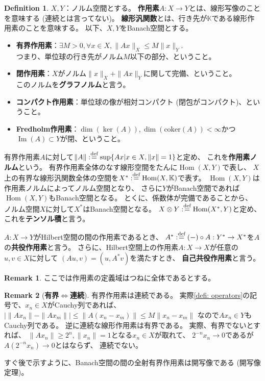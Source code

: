 \documentclass[uplatex]{jsarticle}
\theoremstyle{definition}
\newtheorem{defi}[defi]{Definition}
\newtheorem{rem}[rem]{Remark}
\DeclareMathOperator{\Hom}{Hom}
\DeclareMathOperator{\im}{\mathrm{Im}}
\newcommand{\coker}{\mathrm{coker}}
\newcommand{\dfn}{:\overset{\mbox{{\scriptsize def}}}{=}}
\newcommand{\K}{\mathbb{K}}
\begin{document}
\begin{defi}\label{defi: operators}
  \(X,Y\)：ノルム空間とする。
  \textbf{作用素}\(A:X\to Y\)とは、線形写像のことを意味する (連続とは言ってない)。
  \textbf{線形汎関数}とは、行き先が\(\K\)である線形作用素のことを意味する。
  以下、\(X,Y\)をBanach空間とする。
  \begin{itemize}
    \item \textbf{有界作用素}：\(\exists M>0, \forall x\in X, \|Ax\|_X \leq M\|x\|_Y\). \\
    つまり、単位球の行き先がノルム\(M\)以下の部分、ということ。
    \item \textbf{閉作用素}：\(X\)がノルム\(\|x\|_X + \|Ax\|_Y\)に関して完備、ということ。\\
    このノルムを\textbf{グラフノルム}と言う。
    \item \textbf{コンパクト作用素}：単位球の像が相対コンパクト (閉包がコンパクト)、ということ。
    \item \textbf{Fredholm作用素}：\(\dim(\ker(A)),\dim(\coker(A))<\infty\)かつ\(\im(A)\subset Y\)が閉、ということ。
  \end{itemize}
  有界作用素\(A\)に対して\(\|A\|\dfn \sup\{Ax|x\in X, \|x\|=1\}\)と定め、
  これを\textbf{作用素ノルム}という。
  有界作用素全体のなす線形空間をたんに\(\Hom(X,Y)\)で表し、
  \(X\)上の有界な線形汎関数全体の空間を\(X^* \dfn \Hom(X,\K)\)で表す。
  \(\Hom(X,Y)\)は作用素ノルムによってノルム空間となり、
  さらに\(Y\)がBanach空間であれば\(\Hom(X,Y)\)もBanach空間となる。
  とくに、係数体が完備であることから、
  ノルム空間\(X\)に対して\(X^*\)はBanach空間となる。
  \(X\otimes Y\dfn \Hom(X^*,Y)\)と定め、これを\textbf{テンソル積}と言う。

  \(A:X\to Y\)がHilbert空間の間の作用素であるとき、
  \(A^*\dfn (-)\circ A: Y^*\to X^*\)を\(A\)の\textbf{共役作用素}と言う。
  さらに、Hilbert空間上の作用素\(A:X\to X\)が任意の\(u,v\in X\)に対して
  \((Au,v) = (u,A^*v)\)を満たすとき、
  \textbf{自己共役作用素}と言う。
\end{defi}


\begin{rem}
  ここでは作用素の定義域はつねに全体であるとする。
\end{rem}



\begin{rem}[\textbf{有界\(\iff\)連続}]
  有界作用素は連続である。
  実際\autoref{defi: operators}の記号で、\(x_n\in X\)がCauchy列であれば、
  \(|\|Ax_n\|-\|Ax_m\|| \leq \|A(x_n-x_m)\| \leq M\|x_n-x_m\|\)
  なので\(Ax_n\in Y\)もCauchy列である。
  逆に連続な線形作用素は有界である。
  実際、有界でないとすれば、
  \(\|Ax_n\|\geq 2^n, \|x_n\|=1\)となる\(x_n\in X\)が取れて、
  \(2^{-n}x_n \to 0\)であるが\(A(2^{-n}x_n)\to 0\)とはならず、
  連続でない。

  すぐ後で示すように、Banach空間の間の全射有界作用素は開写像である
  (開写像定理)。
\end{rem}
\end{document}
